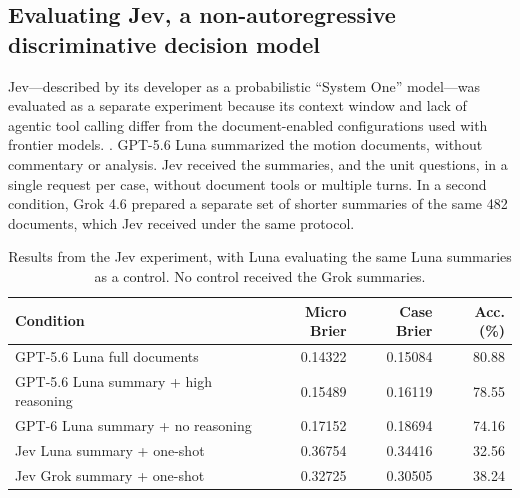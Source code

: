 \documentclass[11pt]{article}
\begin{document}
\subsection{Evaluating Jev, a non-autoregressive discriminative decision model}
Jev---described by its developer as a probabilistic ``System One'' model---was evaluated as a separate experiment because its context window and lack of agentic tool calling differ from the document-enabled configurations used with frontier models. \citep{jevdocs}. GPT-5.6 Luna summarized the motion documents, without commentary or analysis. Jev received the summaries, and the unit questions, in a single request per case, without document tools or multiple turns. In a second condition, Grok 4.6 prepared a separate set of shorter summaries of the same 482 documents, which Jev received under the same protocol.
\begin{table}[tb]\centering\small
\begin{tabular}{lrrr}\toprule
Condition & Micro Brier & Case Brier & Acc. (\%)\\\midrule
GPT-5.6 Luna full documents & 0.14322 & 0.15084 & 80.88 \\
GPT-5.6 Luna summary + high reasoning & 0.15489 & 0.16119 & 78.55 \\
GPT-6 Luna summary + no reasoning & 0.17152 & 0.18694 & 74.16 \\
Jev Luna summary + one-shot & 0.36754 & 0.34416 & 32.56 \\
Jev Grok summary + one-shot & 0.32725 & 0.30505 & 38.24 \\
\bottomrule\end{tabular}
\caption{Results from the Jev experiment, with Luna evaluating the same Luna summaries as a control. No control received the Grok summaries.}
\label{tab:summary}\end{table}
\end{document}
